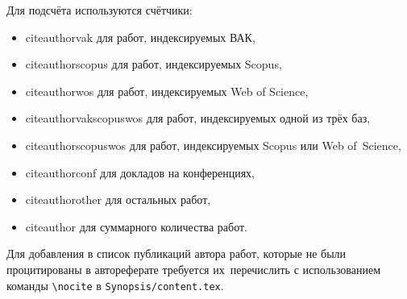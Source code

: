 Для подсчёта используются счётчики:
\begin{itemize}
      \item {citeauthorvak} для работ, индексируемых ВАК,
      \item {citeauthorscopus} для работ, индексируемых Scopus,
      \item {citeauthorwos} для работ, индексируемых Web of Science,
      \item {citeauthorvakscopuswos} для работ, индексируемых одной из трёх баз,
      \item {citeauthorscopuswos} для работ, индексируемых Scopus или Web of~Science,
      \item {citeauthorconf} для докладов на конференциях,
      \item {citeauthorother} для остальных работ,
      \item {citeauthor} для суммарного количества работ.
\end{itemize}

Для добавления в список публикаций автора работ, которые не были процитированы в
автореферате требуется их~перечислить с использованием команды \verb!\nocite! в
\verb!Synopsis/content.tex!.
\fi

